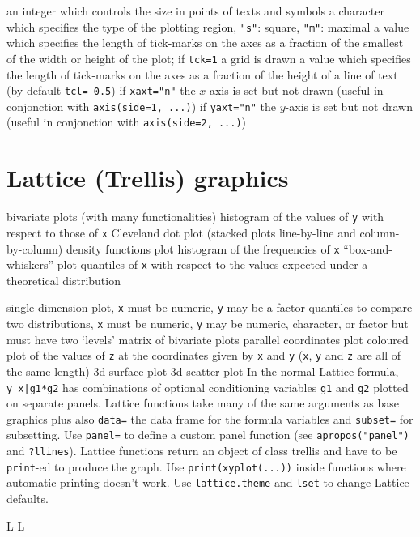 	{ an integer which controls the size in points of texts and symbols}
	{ a character which specifies the type of the plotting region, {\tt "s"}: square, {\tt "m"}: maximal}
	{a value which specifies the length of tick-marks on the axes as a fraction of the smallest of the width or height of the plot; if {\tt tck=1} a grid is drawn}
	{ a value which specifies the length of tick-marks on the axes as a fraction of the height of a line of text (by default {\tt tcl=-0.5})}
	{if {\tt xaxt="n"} the $x$-axis is set but not drawn (useful in conjonction with {\tt axis(side=1, ...)})}
	{if {\tt yaxt="n"} the $y$-axis is set but not drawn (useful in conjonction with {\tt axis(side=2, ...)})}
\section{Lattice (Trellis) graphics}{}

	{ bivariate plots (with many functionalities)}
	{  histogram of the values of {\tt y} with respect to those of {\tt x}}
	{ Cleveland dot plot (stacked plots line-by-line and column-by-column)}
	{ density functions plot}
	{ histogram of the frequencies of {\tt x}}
	{ ``box-and-whiskers'' plot}
	{  quantiles of {\tt x} with respect to the values expected under a theoretical distribution}

	{  single dimension plot, {\tt x} must be numeric, {\tt y} may be a factor}
	{quantiles to compare two distributions, {\tt x} must be numeric, {\tt y} may be numeric, character, or factor but must have two `levels'}
	{ matrix of bivariate plots}
	{ parallel coordinates plot}
	{coloured plot of the values of {\tt z} at the coordinates given by {\tt x} and {\tt y} ({\tt x}, {\tt y} and {\tt z} are all of the same length)}
	{ 3d surface plot}
	{ 3d scatter plot}
In the normal Lattice formula, {\tt y~x|g1*g2} has
combinations of optional conditioning variables {\tt g1}
and {\tt g2} plotted on separate panels. Lattice functions
take many of the same arguments as base
graphics plus also {\tt data=} the data frame for the formula
variables and {\tt subset=} for subsetting. Use {\tt panel=} to
define a custom panel function (see {\tt apropos("panel")}
and {\tt ?llines}). Lattice functions return an object of class
trellis and have to be {\tt print}-ed to produce the graph. Use
{\tt print(xyplot(...))} inside functions where automatic
printing doesn't work. Use {\tt lattice.theme} and {\tt lset} to
change Lattice defaults.


\copyrightnotice

\supereject
\if L\lr \else\null\vfill\eject\fi
\if L\lr \else\null\vfill\eject\fi
\bye

